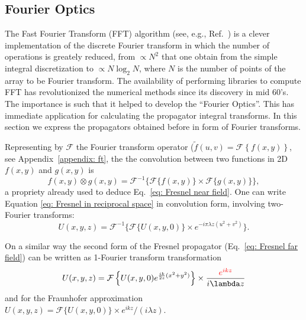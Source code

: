 \documentclass{iucr}              %
\newcommand{\inred}[1]{{\color{red}#1}}
\begin{document}
\subsection{Fourier Optics}

The Fast Fourier Transform (FFT) algorithm (see, e.g., Ref.~\cite{10.2307/2003354}) is a clever implementation of the discrete Fourier transform in which the number of operations is greately reduced, from $\propto N^2$ that one obtain from the simple integral discretization to $\propto N \log_2 N$, where $N$ is the number of points of the array to be Fourier transform. The availability of performing libraries to compute FFT has revolutionized the numerical methods since its discovery in mid 60's. The importance is such that it helped to develop the ``Fourier Optics''. This has immediate application for calculating the propagator integral transforms. In this section we express the propagators obtained before in form of Fourier transforms. 

Representing by $\mathcal{F}$ the Fourier transform operator ($\tilde{f}(u,v)=\mathcal{F}\left\{ f(x,y) \right\}$, see Appendix~\ref{appendix: ft}, the the convolution between two functions in 2D $f(x,y)$ and $g(x,y)$ is
\begin{equation}\label{eq: definition of convolution}
f(x,y) \otimes g(x,y) = \mathcal{F}^{-1}\big\{{\mathcal{F}\{f(x,y)\} \times \mathcal{F}\{g(x,y)\}} \big\},
\end{equation}
a propriety already used to deduce Eq.~\ref{eq: Fresnel near field}. One can write Equation \ref{eq: Fresnel in reciprocal space}  in convolution form, involving two-Fourier transforms:
\begin{equation}\label{eq: ft near field}
U(x, y, z) = \mathcal{F}^{-1}\Big\{ \mathcal{F}\{U(x, y, 0)\} \times e^{-i \pi \lambda z (u^2 + v^2)} \Big\}.
\end{equation} 

On a similar way the second form of the Fresnel propagator (Eq.~\ref{eq: Fresnel far field}) can be written as 1-Fourier transform transformation
\begin{equation}
 U(x,y,z) = \mathcal{F} \left\{ 
 U(x,y,0)  e^{ \frac{i k}{2 z} (x^2 + y^2) } 
 \right\} \times \frac{ \inred{ e^{i k z} } }{i \lambda z}
\end{equation}
and for the Fraunhofer approximation $U(x,y,z) = \mathcal{F} \{ U(x,y,0) \} \times e^{i k z} / (i \lambda z) $. 
\end{document}
